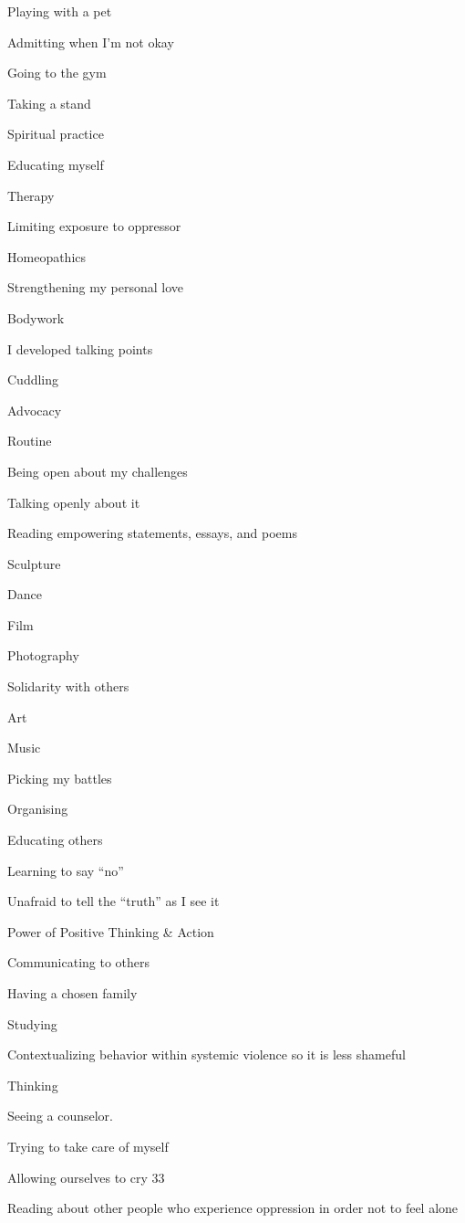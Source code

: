 \begin{multicols}{2}
\begin{checkboxlist}
\item Playing with a pet
\item Admitting when I’m not okay
\item Going to the gym
\item Taking a stand
\item Spiritual practice
\item Educating myself
\item Therapy
\item Limiting exposure to oppressor
\item Homeopathics
\item Strengthening my personal love
\item Bodywork
\item I developed talking points
\item Cuddling
\item Advocacy
\item Routine
\item Being open about my challenges
\item Talking openly about it
\item Reading empowering statements, essays, and poems
\item Sculpture
\item Dance
\item Film
\item Photography
\item Solidarity with others
\item Art
\item Music
\item Picking my battles
\item Organising
\item Educating others
\item Learning to say “no”
\item Unafraid to tell the “truth” as I see it
\item Power of Positive Thinking \& Action
\item Communicating to others
\item Having a chosen family
\item Studying
\item Contextualizing behavior within systemic violence so it is less shameful
\item Thinking
\item Seeing a counselor.
\item Trying to take care of myself
\item Allowing ourselves to cry
33\item Reading about other people who experience oppression in order not to feel alone

\end{checkboxlist}
\end{multicols}
